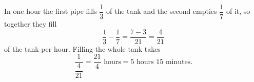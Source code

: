 In one hour the first pipe fills $\dfrac13$ of the tank and the second empties $\dfrac17$ of it, so together they fill
\[\dfrac13-\dfrac17=\dfrac{7-3}{21}=\dfrac{4}{21}\]
of the tank per hour. Filling the whole tank takes
\[\dfrac{1}{\dfrac{4}{21}}=\dfrac{21}{4}\text{ hours}=\boxed{5\text{ hours }15\text{ minutes}}.\]

